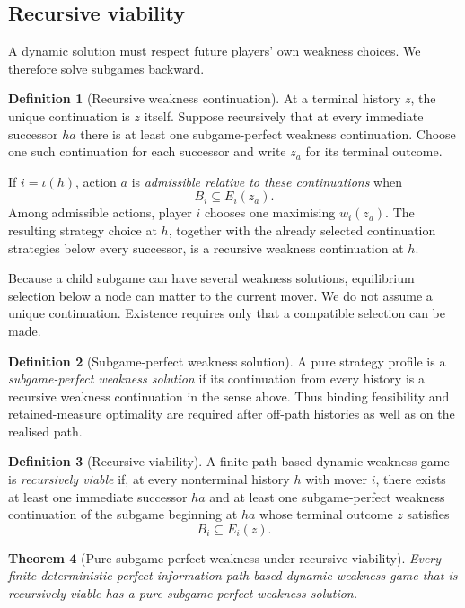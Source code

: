 \documentclass[11pt]{article}
\newtheorem{theorem}{Theorem}
\theoremstyle{definition}
\newtheorem{definition}[theorem]{Definition}
\begin{document}
\subsection{Recursive viability}

A dynamic solution must respect future players' own weakness choices. We therefore solve subgames backward.

\begin{definition}[Recursive weakness continuation]
At a terminal history $z$, the unique continuation is $z$ itself. Suppose recursively that at every immediate successor $ha$ there is at least one subgame-perfect weakness continuation. Choose one such continuation for each successor and write $z_a$ for its terminal outcome.

If $i=\iota(h)$, action $a$ is \emph{admissible relative to these continuations} when
\[
B_i\subseteq E_i(z_a).
\]
Among admissible actions, player $i$ chooses one maximising $w_i(z_a)$. The resulting strategy choice at $h$, together with the already selected continuation strategies below every successor, is a recursive weakness continuation at $h$.
\end{definition}

Because a child subgame can have several weakness solutions, equilibrium selection below a node can matter to the current mover. We do not assume a unique continuation. Existence requires only that a compatible selection can be made.

\begin{definition}[Subgame-perfect weakness solution]
A pure strategy profile is a \emph{subgame-perfect weakness solution} if its continuation from every history is a recursive weakness continuation in the sense above. Thus binding feasibility and retained-measure optimality are required after off-path histories as well as on the realised path.
\end{definition}

\begin{definition}[Recursive viability]
A finite path-based dynamic weakness game is \emph{recursively viable} if, at every nonterminal history $h$ with mover $i$, there exists at least one immediate successor $ha$ and at least one subgame-perfect weakness continuation of the subgame beginning at $ha$ whose terminal outcome $z$ satisfies
\[
B_i\subseteq E_i(z).
\]
\end{definition}

\begin{theorem}[Pure subgame-perfect weakness under recursive viability]\label{thm:backward}
Every finite deterministic perfect-information path-based dynamic weakness game that is recursively viable has a pure subgame-perfect weakness solution.
\end{theorem}
\end{document}
